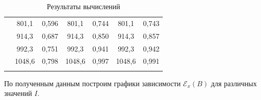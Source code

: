 \documentclass[a4paper,12pt]{article} %
\begin{document}
\begin{longtable}[c]{c|cc|cc|cc|}
	& \multicolumn{1}{c|}{801,1}   & 0,596               & \multicolumn{1}{c|}{801,1}   & 0,744               & \multicolumn{1}{c|}{801,1}   & 0,743               \\ \cline{2-7} 
	& \multicolumn{1}{c|}{914,3}   & 0,687               & \multicolumn{1}{c|}{914,3}   & 0,850               & \multicolumn{1}{c|}{914,3}   & 0,857               \\ \cline{2-7} 
	& \multicolumn{1}{c|}{992,3}   & 0,751               & \multicolumn{1}{c|}{992,3}   & 0,941               & \multicolumn{1}{c|}{992,3}   & 0,942               \\ \cline{2-7} 
	& \multicolumn{1}{c|}{1048,6}  & 0,798               & \multicolumn{1}{c|}{1048,6}  & 0,997               & \multicolumn{1}{c|}{1048,6}  & 0,991               \\ \cline{2-7} 
	\caption{Результаты вычислений}
	\label{tab3}\\
\end{longtable}

По полученным данным построим графики зависимости $ \mathcal{E}_x(B) $ для различных значений $ I $.
\end{document}
